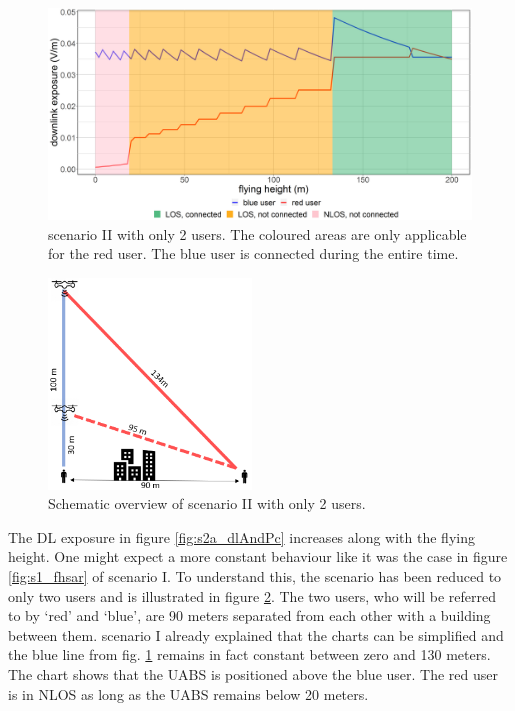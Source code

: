 \begin{figure}[]
  \includegraphics[width=\textwidth]{../results/s2/prove.png}
  \caption{scenario II with only 2 users. The coloured areas are only applicable for the red user. The blue user is connected during the entire time.}
  \label{fig:prove}
\end{figure}


\begin{figure}
  \begin{center}
    \includegraphics[width=0.48\textwidth]{../results/s2/proveScenario.png}
  \end{center}
  \caption{Schematic overview of scenario II with only 2 users.}
  \label{fig:schematicprove}
\end{figure}
The \gls{DL} exposure in figure \ref{fig:s2a_dlAndPc} increases along with the flying height. One might expect a more constant 
behaviour like it was the case in figure \ref{fig:s1_fhsar} of scenario I. To understand this, the scenario has been reduced  
to only two users and is illustrated in figure \ref{fig:schematicprove}.
The two users, who will be referred to by `red' and `blue', are 90 meters separated from each other with a building between them.
scenario I already explained that the charts can be simplified and the blue line from fig. \ref{fig:prove} remains in fact constant between zero and 130 meters.
The chart shows that the \gls{UABS} is positioned above the blue user. The red user is in \gls{NLOS} as long as the \gls{UABS} remains below 20 meters.

